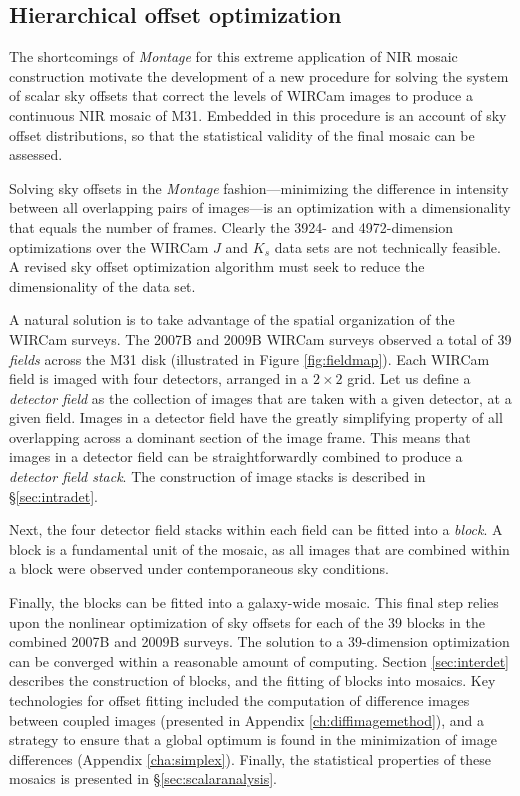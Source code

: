 \documentclass[iop]{emulateapj}
\newcommand{\sw}[1]{\textit{#1}} %
\begin{document}
\subsection{Hierarchical offset optimization}
\label{sec:hierarchicaloffsets}

The shortcomings of \sw{Montage} for this extreme application of NIR mosaic construction motivate the development of a new procedure for solving the system of scalar sky offsets that correct the levels of WIRCam images to produce a continuous NIR mosaic of M31. Embedded in this procedure is an account of sky offset distributions, so that the statistical validity of the final mosaic can be assessed.

Solving sky offsets in the \sw{Montage} fashion---minimizing the difference in intensity between all overlapping pairs of images---is an optimization with a dimensionality that equals the number of frames. Clearly the 3924- and 4972-dimension optimizations over the WIRCam $J$ and $K_s$ data sets are not technically feasible. A revised sky offset optimization algorithm must seek to reduce the dimensionality of the data set.

A natural solution is to take advantage of the spatial organization of the WIRCam surveys. The 2007B and 2009B WIRCam surveys observed a total of 39 \emph{fields} across the M31 disk (illustrated in Figure \ref{fig:fieldmap}). Each WIRCam field is imaged with four detectors, arranged in a $2\times 2$ grid. Let us define a \emph{detector field} as the collection of images that are taken with a given detector, at a given field. Images in a detector field have the greatly simplifying property of all overlapping across a dominant section of the image frame. This means that images in a detector field can be straightforwardly combined to produce a \emph{detector field stack}. The construction of image stacks is described in \S\ref{sec:intradet}.

Next, the four detector field stacks within each field can be fitted into a \emph{block}. A block is a fundamental unit of the mosaic, as all images that are combined within a block were observed under contemporaneous sky conditions.

Finally, the blocks can be fitted into a galaxy-wide mosaic. This final step relies upon the nonlinear optimization of sky offsets for each of the 39 blocks in the combined 2007B and 2009B surveys. The solution to a 39-dimension optimization can be converged within a reasonable amount of computing. Section \ref{sec:interdet} describes the construction of blocks, and the fitting of blocks into mosaics. Key technologies for offset fitting included the computation of difference images between coupled images (presented in Appendix \ref{ch:diffimagemethod}), and a strategy to ensure that a global optimum is found in the minimization of image differences (Appendix \ref{cha:simplex}). Finally, the statistical properties of these mosaics is presented in \S\ref{sec:scalaranalysis}.
\end{document}
